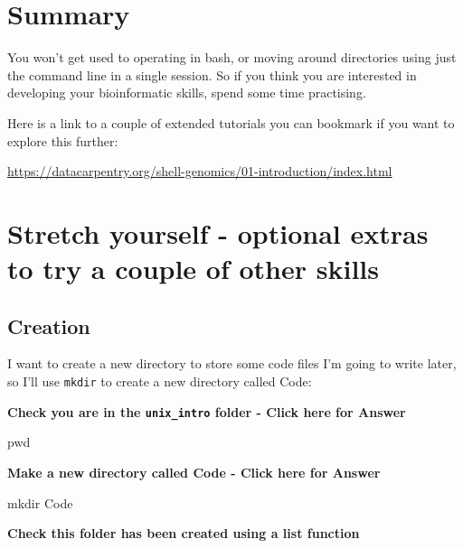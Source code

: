 \documentclass[
]{book}
\newenvironment{Shaded}{\begin{snugshade}}{\end{snugshade}}
\newcommand{\BuiltInTok}[1]{#1}
\newcommand{\FunctionTok}[1]{\textcolor[rgb]{0.00,0.00,0.00}{#1}}
\newcommand{\NormalTok}[1]{#1}
\begin{document}
\hypertarget{summary-1}{%
\section{Summary}\label{summary-1}}

You won't get used to operating in bash, or moving around directories using just the command line in a single session. So if you think you are interested in developing your bioinformatic skills, spend some time practising.

Here is a link to a couple of extended tutorials you can bookmark if you want to explore this further:

\url{https://datacarpentry.org/shell-genomics/01-introduction/index.html}

\hypertarget{stretch-yourself---optional-extras-to-try-a-couple-of-other-skills}{%
\section{Stretch yourself - optional extras to try a couple of other skills}\label{stretch-yourself---optional-extras-to-try-a-couple-of-other-skills}}

\hypertarget{creation}{%
\subsection{Creation}\label{creation}}

I want to create a new directory to store some code files I'm going to write later, so I'll use \texttt{mkdir} to create a new directory called Code:

\textbf{Check you are in the \texttt{unix\_intro} folder - Click here for Answer}

\begin{Shaded}
\begin{Highlighting}[]
\BuiltInTok{pwd}
\end{Highlighting}
\end{Shaded}

\textbf{Make a new directory called Code - Click here for Answer}

\begin{Shaded}
\begin{Highlighting}[]
\FunctionTok{mkdir}\NormalTok{ Code}
\end{Highlighting}
\end{Shaded}

\textbf{Check this folder has been created using a list function}
\end{document}
